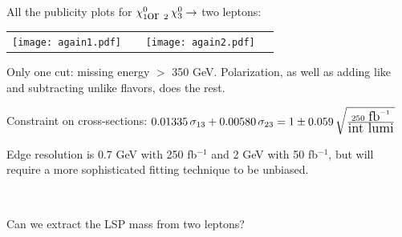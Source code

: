 \documentclass[landscape]{article}
\begin{document}
\huge
\renewcommand{\labelitemi}{-}
\setlength{\parindent}{0 cm}

All the publicity plots for $\chi_{1 \mbox{\large or } 2}^0 \, \chi_3^0 \to$ two leptons:

\vfill

\begin{center} \begin{tabular}{p{0.45\linewidth} p{0.45\linewidth}}
    \texttt{[image: again1.pdf]} &
    \texttt{[image: again2.pdf]}
\end{tabular} \end{center}

\vfill

Only one cut: missing energy $>$ 350 GeV.  Polarization, as well as
adding like and subtracting unlike flavors, does the rest.

\vfill

Constraint on cross-sections: $0.01335 \, \sigma_{13} + 0.00580 \, \sigma_{23} = 1 \pm 0.059 \, \sqrt{\frac{250 \mbox{ \large fb}^{-1}}{\mbox{\large int lumi}}}$

\vfill

Edge resolution is 0.7 GeV with 250 fb$^{-1}$ and 2 GeV with 50
fb$^{-1}$, but will require a more sophisticated fitting technique to
be unbiased.

\pagebreak

\mbox{ }

\vfill

Can we extract the LSP mass from two leptons?

\vfill
\end{document}
